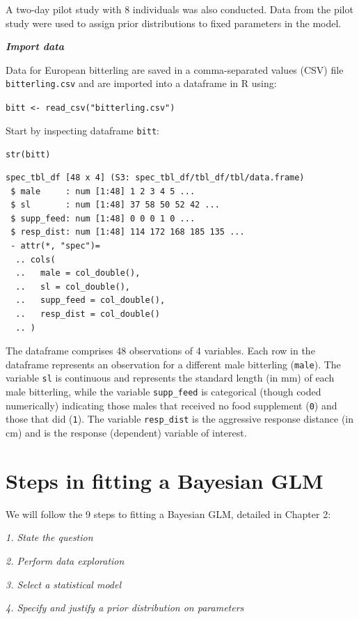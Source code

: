 \documentclass[
]{book}
\begin{document}
A two-day pilot study with 8 individuals was also conducted. Data from the pilot study were used to assign prior distributions to fixed parameters in the model.

\emph{\textbf{Import data}}

Data for European bitterling are saved in a comma-separated values (CSV) file \texttt{bitterling.csv} and are imported into a dataframe in R using:

\texttt{bitt\ \textless{}-\ read\_csv("bitterling.csv")}

Start by inspecting dataframe \texttt{bitt}:

\texttt{str(bitt)}

\begin{verbatim}
spec_tbl_df [48 x 4] (S3: spec_tbl_df/tbl_df/tbl/data.frame)
 $ male     : num [1:48] 1 2 3 4 5 ...
 $ sl       : num [1:48] 37 58 50 52 42 ...
 $ supp_feed: num [1:48] 0 0 0 1 0 ...
 $ resp_dist: num [1:48] 114 172 168 185 135 ...
 - attr(*, "spec")=
  .. cols(
  ..   male = col_double(),
  ..   sl = col_double(),
  ..   supp_feed = col_double(),
  ..   resp_dist = col_double()
  .. )
\end{verbatim}

The dataframe comprises 48 observations of 4 variables. Each row in the dataframe represents an observation for a different male bitterling (\texttt{male}). The variable \texttt{sl} is continuous and represents the standard length (in mm) of each male bitterling, while the variable \texttt{supp\_feed} is categorical (though coded numerically) indicating those males that received no food supplement (\texttt{0}) and those that did (\texttt{1}). The variable \texttt{resp\_dist} is the aggressive response distance (in cm) and is the response (dependent) variable of interest.

\hypertarget{glm-steps}{%
\section{Steps in fitting a Bayesian GLM}\label{glm-steps}}

We will follow the 9 steps to fitting a Bayesian GLM, detailed in Chapter 2:

\emph{1. State the question}

\emph{2. Perform data exploration}

\emph{3. Select a statistical model}

\emph{4. Specify and justify a prior distribution on parameters}
\end{document}

